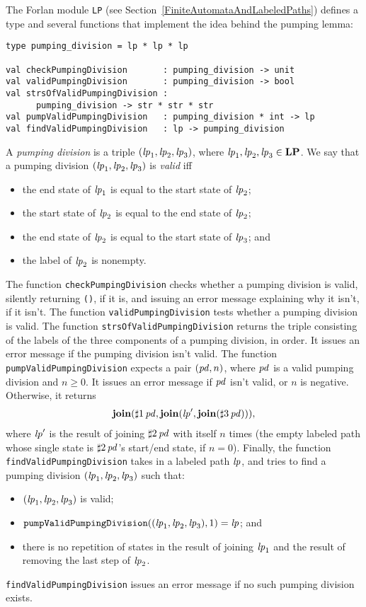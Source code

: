 The Forlan module \texttt{LP}
(see Section~\ref{FiniteAutomataAndLabeledPaths}) defines a type and
several functions that implement the idea behind the pumping lemma:
\begin{verbatim}
type pumping_division = lp * lp * lp

val checkPumpingDivision       : pumping_division -> unit
val validPumpingDivision       : pumping_division -> bool
val strsOfValidPumpingDivision :
      pumping_division -> str * str * str
val pumpValidPumpingDivision   : pumping_division * int -> lp
val findValidPumpingDivision   : lp -> pumping_division
\end{verbatim}
A \emph{pumping division} is a triple $({\it lp}_1,{\it lp}_2,{\it lp}_3)$,
where ${\it lp}_1,{\it lp}_2,{\it lp}_3\in\mathbf{LP}$.  We say that a pumping division
$({\it lp}_1,{\it lp}_2,{\it lp}_3)$ is \emph{valid} iff
\begin{itemize}
\item the end state of ${\it lp}_1$ is equal to the start state of ${\it lp}_2$;

\item the start state of ${\it lp}_2$ is equal to the end state of ${\it lp}_2$;

\item the end state of ${\it lp}_2$ is equal to the start state of ${\it lp}_3$; and

\item the label of ${\it lp}_2$ is nonempty.
\end{itemize}
The function \texttt{checkPumpingDivision} checks whether a pumping
division is valid, silently returning \texttt{()}, if it is, and
issuing an error message explaining why it isn't, if it isn't.  The
function \texttt{validPumpingDivision} tests whether a pumping
division is valid.  The function \texttt{strsOfValidPumpingDivision}
returns the triple consisting of the labels of the three components of
a pumping division, in order.  It issues an error message if the pumping
division isn't valid.
The function \texttt{pumpValidPumpingDivision} expects a pair
$({\it pd}, n)$, where ${\it pd}$ is a valid pumping division and $n\geq 0$.
It issues an error message if ${\it pd}$ isn't valid, or $n$ is negative.
Otherwise, it returns
\begin{gather*}
\mathbf{join}({{\sharp}1}\,{\it pd},\mathbf{join}({\it lp}',\mathbf{join}({{\sharp}3}\,{\it pd}))) ,
\end{gather*}
where ${\it lp}'$ is the result of joining ${{\sharp}2}\,{\it pd}$ with itself $n$
times (the empty labeled path whose single state is ${{\sharp}2}\,{\it pd}$'s
start/end state, if $n=0$).  Finally, the function
\texttt{findValidPumpingDivision} takes in a labeled path ${\it lp}$, and
tries to find a pumping division $({\it lp}_1, {\it lp}_2, {\it lp}_3)$ such that:
\begin{itemize}
\item $({\it lp}_1, {\it lp}_2, {\it lp}_3)$ is valid;

\item $\mathtt{pumpValidPumpingDivision}(({\it lp}_1, {\it lp}_2, {\it lp}_3), 1) = {\it lp}$;
  and

\item there is no repetition of states in the result of joining ${\it lp}_1$ and
  the result of removing the last step of ${\it lp}_2$.
\end{itemize}
\texttt{findValidPumpingDivision} issues an error message if
no such pumping division exists.

